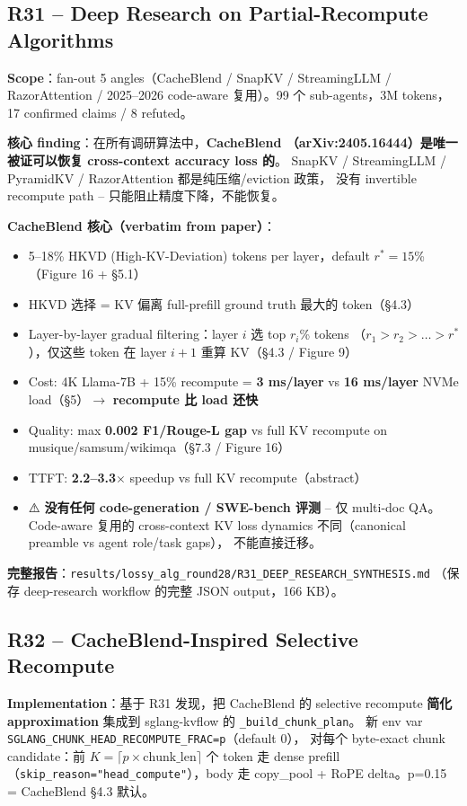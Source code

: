 \documentclass[11pt,a4paper]{article}
\begin{document}
\subsection*{R31 -- Deep Research on Partial-Recompute Algorithms}
\textbf{Scope}：fan-out 5 angles（CacheBlend / SnapKV / StreamingLLM /
RazorAttention / 2025--2026 code-aware 复用）。99 个 sub-agents，3M tokens，
17 confirmed claims / 8 refuted。

\textbf{核心 finding}：在所有调研算法中，\textbf{CacheBlend
（arXiv:2405.16444）是唯一被证可以恢复 cross-context accuracy loss 的}。
SnapKV / StreamingLLM / PyramidKV / RazorAttention 都是纯压缩/eviction 政策，
没有 invertible recompute path -- 只能阻止精度下降，不能恢复。

\textbf{CacheBlend 核心（verbatim from paper）}：
\begin{itemize}
  \item 5--18\% HKVD (High-KV-Deviation) tokens per layer，default $r^*=15$\%
        （Figure 16 + §5.1）
  \item HKVD 选择 = KV 偏离 full-prefill ground truth 最大的 token（§4.3）
  \item Layer-by-layer gradual filtering：layer $i$ 选 top $r_i$\% tokens
        （$r_1 > r_2 > \ldots > r^*$），仅这些 token 在 layer $i+1$ 重算
        KV（§4.3 / Figure 9）
  \item Cost: 4K Llama-7B + 15\% recompute = \textbf{3 ms/layer} vs
        \textbf{16 ms/layer} NVMe load（§5）$\to$ \textbf{recompute 比 load 还快}
  \item Quality: max \textbf{0.002 F1/Rouge-L gap} vs full KV recompute on
        musique/samsum/wikimqa（§7.3 / Figure 16）
  \item TTFT: \textbf{2.2--3.3$\times$} speedup vs full KV recompute（abstract）
  \item ⚠️ \textbf{没有任何 code-generation / SWE-bench 评测}
        -- 仅 multi-doc QA。Code-aware 复用的 cross-context KV loss
        dynamics 不同（canonical preamble vs agent role/task gaps），
        不能直接迁移。
\end{itemize}

\textbf{完整报告}：\texttt{results/lossy\_alg\_round28/R31\_DEEP\_RESEARCH\_SYNTHESIS.md}
（保存 deep-research workflow 的完整 JSON output，166 KB）。

\subsection*{R32 -- CacheBlend-Inspired Selective Recompute}
\textbf{Implementation}：基于 R31 发现，把 CacheBlend 的 selective recompute
\textbf{简化 approximation} 集成到 sglang-kvflow 的 \texttt{\_build\_chunk\_plan}。
新 env var \texttt{SGLANG\_CHUNK\_HEAD\_RECOMPUTE\_FRAC=p}（default 0），
对每个 byte-exact chunk candidate：前 $K=\lceil p \times \text{chunk\_len}\rceil$ 个
token 走 dense prefill（\texttt{skip\_reason="head\_compute"}），body 走 copy\_pool
+ RoPE delta。p=0.15 = CacheBlend §4.3 默认。
\end{document}
